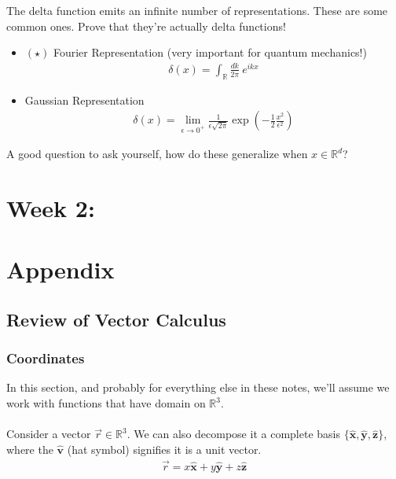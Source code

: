 \documentclass[12pt,fleqn]{article}
\numberwithin{equation}{section} %
\newcounter{problem}
\begin{document}
\begin{problem} The delta function emits an infinite number of representations. These are some common ones. Prove that they're actually delta functions!
	\begin{itemize}
		\item $(\star)$ Fourier Representation (very important for quantum mechanics!)
		\begin{align}
			\delta(x) = \int_{\mathbb R} \frac{d k}{2\pi} ~ e^{i k x}
		\end{align}
		
		\item Gaussian Representation
		\begin{align}
			\delta(x) = \lim_{\epsilon \to 0^+}  \frac{1}{\epsilon \sqrt{2\pi}} \exp \left(-\frac{1}{2} \frac{x^2}{\epsilon^2} \right)
		\end{align}
	\end{itemize}
	A good question to ask yourself, how do these generalize when $x \in \mathbb R^d$?
\end{problem}

\newpage
\section{Week 2: }


\newpage
\section{Appendix}

\subsection{Review of Vector Calculus}
\subsubsection{Coordinates}
In this section, and probably for everything else in these notes, we'll assume we work with functions that have domain on $\mathbb R^3$.\\
\\
Consider a vector $\vec r \in \mathbb R^3$. We can also decompose it a complete basis $\{\mathbf{\hat x}, \mathbf{\hat y}, \mathbf{\hat z}\}$, where the $\mathbf{\hat v}$ (hat symbol) signifies it is a unit vector.
\begin{align}
	\vec r  = x \mathbf{\hat x} + y \mathbf{\hat y} + z \mathbf {\hat z}
\end{align}
\end{document}
